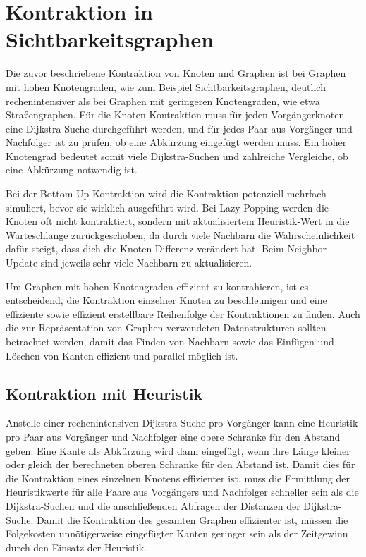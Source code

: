 \chapter{Kontraktion in Sichtbarkeitsgraphen}\label{chapter:kontraktion}

Die zuvor beschriebene Kontraktion von Knoten und Graphen ist bei Graphen mit hohen Knotengraden, wie zum Beispiel Sichtbarkeitsgraphen, deutlich rechenintensiver als bei Graphen mit geringeren Knotengraden, wie etwa Straßengraphen.
Für die Knoten-Kontraktion muss für jeden Vorgängerknoten eine Dijkstra-Suche durchgeführt werden, und für jedes Paar aus Vorgänger und Nachfolger ist zu prüfen, ob eine Abkürzung eingefügt werden muss.
Ein hoher Knotengrad bedeutet somit viele Dijkstra-Suchen und zahlreiche Vergleiche, ob eine Abkürzung notwendig ist.

Bei der Bottom-Up-Kontraktion wird die Kontraktion potenziell mehrfach simuliert, bevor sie wirklich ausgeführt wird.
Bei Lazy-Popping werden die Knoten oft nicht kontraktiert, sondern mit aktualisiertem Heuristik-Wert in die Warteschlange zurückgeschoben, da durch viele Nachbarn die Wahrscheinlichkeit dafür steigt, dass dich die Knoten-Differenz verändert hat.
Beim Neighbor-Update sind jeweils sehr viele Nachbarn zu aktualisieren.

Um Graphen mit hohen Knotengraden effizient zu kontrahieren, ist es entscheidend, die Kontraktion einzelner Knoten zu beschleunigen und eine effiziente sowie effizient erstellbare Reihenfolge der Kontraktionen zu finden.
Auch die zur Repräsentation von Graphen verwendeten Datenstrukturen sollten betrachtet werden, damit das Finden von Nachbarn sowie das Einfügen und Löschen von Kanten effizient und parallel möglich ist.

\section{Kontraktion mit Heuristik}

Anstelle einer rechenintensiven Dijkstra-Suche pro Vorgänger kann eine Heuristik pro Paar aus Vorgänger und Nachfolger eine obere Schranke für den Abstand geben.
Eine Kante als Abkürzung wird dann eingefügt, wenn ihre Länge kleiner oder gleich der berechneten oberen Schranke für den Abstand ist.
Damit dies für die Kontraktion eines einzelnen Knotens effizienter ist, muss die Ermittlung der Heuristikwerte für alle Paare aus Vorgängers und Nachfolger schneller sein als die Dijkstra-Suchen und die anschließenden Abfragen der Distanzen der Dijkstra-Suche.
Damit die Kontraktion des gesamten Graphen effizienter ist, müssen die Folgekosten unnötigerweise eingefügter Kanten geringer sein als der Zeitgewinn durch den Einsatz der Heuristik.

